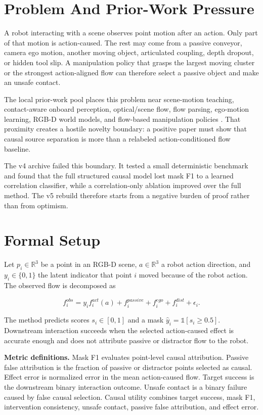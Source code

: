 \documentclass{article}
\begin{document}
\section{Problem And Prior-Work Pressure}

A robot interacting with a scene observes point motion after an action. Only part of that motion is action-caused. The rest may come from a passive conveyor, camera ego motion, another moving object, articulated coupling, depth dropout, or hidden tool slip. A manipulation policy that grasps the largest moving cluster or the strongest action-aligned flow can therefore select a passive object and make an unsafe contact.

The local prior-work pool places this problem near scene-motion teaching, contact-aware onboard perception, optical/scene flow, flow parsing, ego-motion learning, RGB-D world models, and flow-based manipulation policies \citep{pool84_01,pool84_02,pool84_03,pool84_06,pool84_07,pool84_11,pool84_12}. That proximity creates a hostile novelty boundary: a positive paper must show that causal source separation is more than a relabeled action-conditioned flow baseline.

The v4 archive failed this boundary. It tested a small deterministic benchmark and found that the full structured causal model lost mask F1 to a learned correlation classifier, while a correlation-only ablation improved over the full method. The v5 rebuild therefore starts from a negative burden of proof rather than from optimism.

\section{Formal Setup}

Let $p_i\in\mathbb{R}^3$ be a point in an RGB-D scene, $a\in\mathbb{R}^3$ a robot action direction, and $y_i\in\{0,1\}$ the latent indicator that point $i$ moved because of the robot action. The observed flow is decomposed as

\begin{equation}
f_i^{obs} = y_i f_i^{act}(a) + f_i^{passive} + f_i^{ego} + f_i^{dist} + \epsilon_i.
\end{equation}

The method predicts scores $s_i\in[0,1]$ and a mask $\hat y_i=\mathbb{1}[s_i\geq 0.5]$. Downstream interaction succeeds when the selected action-caused effect is accurate enough and does not attribute passive or distractor flow to the robot.

\textbf{Metric definitions.} Mask F1 evaluates point-level causal attribution. Passive false attribution is the fraction of passive or distractor points selected as causal. Effect error is normalized error in the mean action-caused flow. Target success is the downstream binary interaction outcome. Unsafe contact is a binary failure caused by false causal selection. Causal utility combines target success, mask F1, intervention consistency, unsafe contact, passive false attribution, and effect error.
\end{document}
